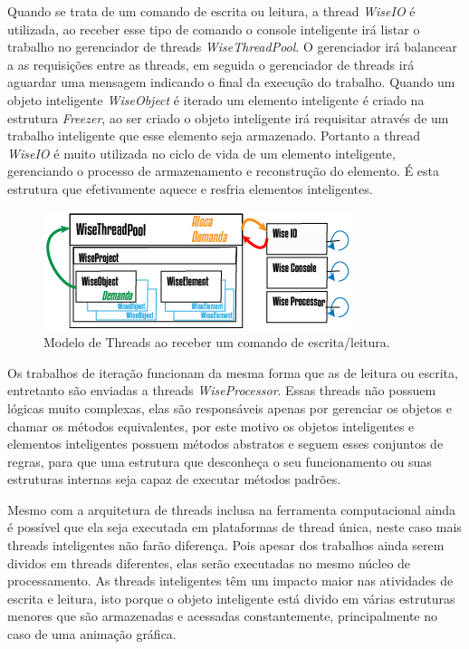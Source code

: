 \documentclass[
        english,			
        brazil			        %
        ,<...>]{abntbibufjf}
\begin{document}
Quando se trata de um comando de escrita ou leitura, a thread \textit{WiseIO} é utilizada, ao receber esse tipo de comando o console inteligente irá listar o trabalho no gerenciador de threads \textit{WiseThreadPool}. O gerenciador irá balancear a as requisições entre as threads, em seguida o gerenciador de threads irá aguardar uma mensagem indicando o final da execução do trabalho. Quando um objeto inteligente \textit{WiseObject} é iterado um elemento inteligente é criado na estrutura \textit{Freezer}, ao ser criado o objeto inteligente irá requisitar através de um trabalho inteligente que esse elemento seja armazenado. Portanto a thread \textit{WiseIO} é muito utilizada no ciclo de vida de um elemento inteligente, gerenciando o processo de armazenamento e reconstrução do elemento. É esta estrutura que efetivamente aquece e resfria elementos inteligentes.

\begin{figure}[!htbp]
	\centering
	\includegraphics[scale=1]{Figures/WiseThreadPoolHeating.png}
	\caption{Modelo de Threads ao receber um comando de escrita/leitura.}
	\label{fig9:threads}
\end{figure}

Os trabalhos de iteração funcionam da mesma forma que as de leitura ou escrita, entretanto são enviadas a threads \textit{WiseProcessor}. Essas threads não possuem lógicas muito complexas, elas são responsáveis apenas por gerenciar os objetos e chamar os métodos equivalentes, por este motivo os objetos inteligentes e elementos inteligentes possuem métodos abstratos e seguem esses conjuntos de regras, para que uma estrutura que desconheça o seu funcionamento ou suas estruturas internas seja capaz de executar métodos padrões. 

Mesmo com a arquitetura de threads inclusa na ferramenta computacional ainda é possível que ela seja executada em plataformas de thread única, neste caso mais threads inteligentes não farão diferença. Pois apesar dos trabalhos ainda serem dividos em threads diferentes, elas serão executadas no mesmo núcleo de processamento. As threads inteligentes têm um impacto maior nas atividades de escrita e leitura, isto porque o objeto inteligente está divido em várias estruturas menores que são armazenadas e acessadas constantemente, principalmente no caso de uma animação gráfica.
\end{document}
